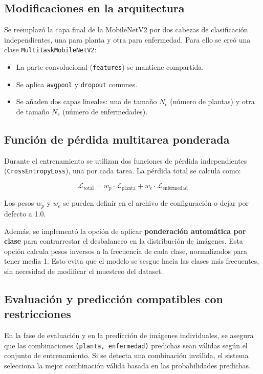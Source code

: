 \documentclass[12pt,a4paper]{article}
\begin{document}
\subsection{Modificaciones en la arquitectura}

Se reemplazó la capa final de la MobileNetV2 por dos cabezas de clasificación independientes, una para planta y otra para enfermedad. Para ello se creó una clase \texttt{MultiTaskMobileNetV2}:

\begin{itemize}
  \item La parte convolucional (\texttt{features}) se mantiene compartida.
  \item Se aplica \texttt{avgpool} y \texttt{dropout} comunes.
  \item Se añaden dos capas lineales: una de tamaño $N_c$ (número de plantas) y otra de tamaño $N_e$ (número de enfermedades).
\end{itemize}

\subsection{Función de pérdida multitarea ponderada}

Durante el entrenamiento se utilizan dos funciones de pérdida independientes (\texttt{CrossEntropyLoss}), una por cada tarea. La pérdida total se calcula como:

\[
\mathcal{L}_{\text{total}} = w_p \cdot \mathcal{L}_{\text{planta}} + w_e \cdot \mathcal{L}_{\text{enfermedad}}
\]

Los pesos $w_p$ y $w_e$ se pueden definir en el archivo de configuración o dejar por defecto a 1.0.

Además, se implementó la opción de aplicar \textbf{ponderación automática por clase} para contrarrestar el desbalanceo en la distribución de imágenes. Esta opción calcula pesos inversos a la frecuencia de cada clase, normalizados para tener media 1. Esto evita que el modelo se sesgue hacia las clases más frecuentes, sin necesidad de modificar el muestreo del dataset.

\subsection{Evaluación y predicción compatibles con restricciones}

En la fase de evaluación y en la predicción de imágenes individuales, se asegura que las combinaciones \texttt{(planta, enfermedad)} predichas sean válidas según el conjunto de entrenamiento. Si se detecta una combinación inválida, el sistema selecciona la mejor combinación válida basada en las probabilidades predichas.
\end{document}
